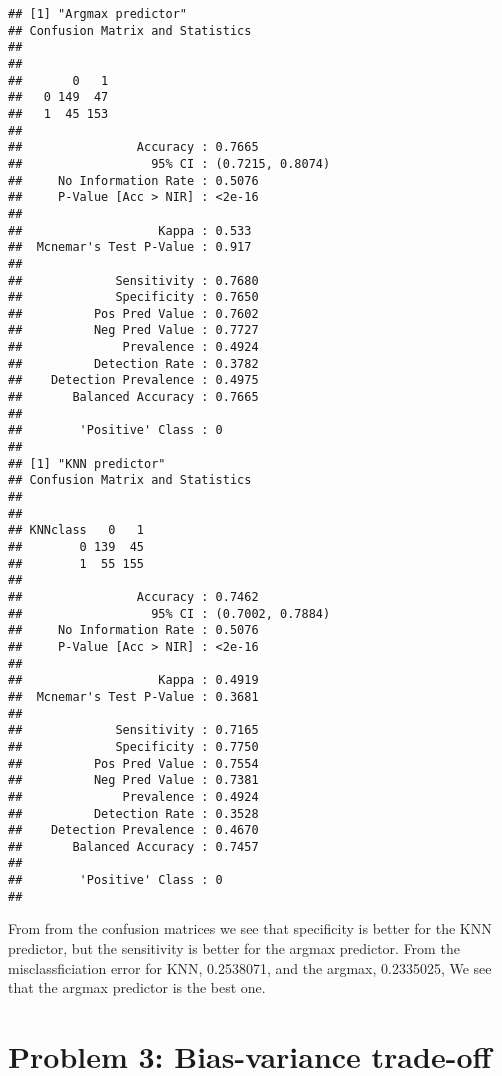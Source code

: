 \documentclass[]{article}
\begin{document}
\begin{verbatim}
## [1] "Argmax predictor"
## Confusion Matrix and Statistics
## 
##    
##       0   1
##   0 149  47
##   1  45 153
##                                           
##                Accuracy : 0.7665          
##                  95% CI : (0.7215, 0.8074)
##     No Information Rate : 0.5076          
##     P-Value [Acc > NIR] : <2e-16          
##                                           
##                   Kappa : 0.533           
##  Mcnemar's Test P-Value : 0.917           
##                                           
##             Sensitivity : 0.7680          
##             Specificity : 0.7650          
##          Pos Pred Value : 0.7602          
##          Neg Pred Value : 0.7727          
##              Prevalence : 0.4924          
##          Detection Rate : 0.3782          
##    Detection Prevalence : 0.4975          
##       Balanced Accuracy : 0.7665          
##                                           
##        'Positive' Class : 0               
##                                           
## [1] "KNN predictor"
## Confusion Matrix and Statistics
## 
##         
## KNNclass   0   1
##        0 139  45
##        1  55 155
##                                           
##                Accuracy : 0.7462          
##                  95% CI : (0.7002, 0.7884)
##     No Information Rate : 0.5076          
##     P-Value [Acc > NIR] : <2e-16          
##                                           
##                   Kappa : 0.4919          
##  Mcnemar's Test P-Value : 0.3681          
##                                           
##             Sensitivity : 0.7165          
##             Specificity : 0.7750          
##          Pos Pred Value : 0.7554          
##          Neg Pred Value : 0.7381          
##              Prevalence : 0.4924          
##          Detection Rate : 0.3528          
##    Detection Prevalence : 0.4670          
##       Balanced Accuracy : 0.7457          
##                                           
##        'Positive' Class : 0               
## 
\end{verbatim}

From from the confusion matrices we see that specificity is better for
the KNN predictor, but the sensitivity is better for the argmax
predictor. From the misclassficiation error for KNN, 0.2538071, and the
argmax, 0.2335025, We see that the argmax predictor is the best one.

\section{Problem 3: Bias-variance
trade-off}\label{problem-3-bias-variance-trade-off}
\end{document}
